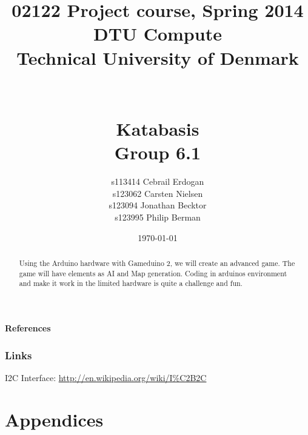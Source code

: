 \documentclass[12pt]{report}
\title{02122 Project course, Spring 2014 \\
DTU Compute \\
Technical University of Denmark \\~\\~\\ Katabasis \\ Group 6.1}
\author{s113414 Cebrail Erdogan \\
        s123062 Carsten Nielsen \\
        s123094 Jonathan Becktor\\
        s123995 Philip Berman   \\  }
\date{\today}
\begin{document}
\maketitle

\begin{abstract}
Using the Arduino hardware with Gameduino 2, we will create an advanced game.
The game will have elements as AI and Map generation.
Coding in arduinos environment and make it work in the
limited hardware is quite a challenge and fun.
\end{abstract}


\tableofcontents

\newpage



\newpage













%







\newpage

\textbf{References}

\subsection{Links}


I2C Interface: \url{http://en.wikipedia.org/wiki/I%C2B2C}

\newpage
\chapter{Appendices}
\end{document}
